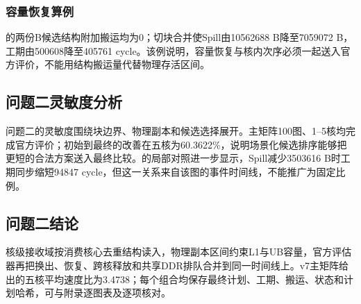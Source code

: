 \subsubsection{容量恢复算例}
的两份B候选结构附加搬运均为0；切块合并使Spill由10562688 B降至7059072 B，工期由500608降至405761 cycle。该例说明，容量恢复与核内次序必须一起送入官方评价，不能用结构搬运量代替物理存活区间。

\subsection{问题二灵敏度分析}
问题二的灵敏度围绕块边界、物理副本和候选选择展开。主矩阵100图、1--5核均完成官方评价；初始到最终的改善在五核为60.3622\%，说明场景化候选排序能够把更短的合法方案送入最终比较。的局部对照进一步显示，Spill减少3503616 B时工期同步缩短94847 cycle，但这一关系来自该图的事件时间线，不能推广为固定比例。

\subsection{问题二结论}
核级接收域按消费核心去重结构读入，物理副本区间约束L1与UB容量，官方评估器再把换出、恢复、跨核释放和共享DDR排队合并到同一时间线上。v7主矩阵给出的五核平均速度比为3.4738；每个组合均保存最终计划、工期、搬运、状态和计划哈希，可与附录逐图表及逐项核对。
